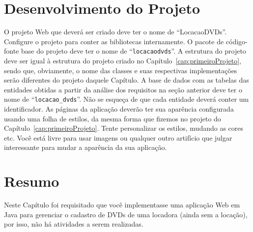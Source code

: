 \section{Desenvolvimento do Projeto}

O projeto Web que deverá ser criado deve ter o nome de ``LocacaoDVDs''. Configure o projeto para conter as bibliotecas internamente. O pacote de código-fonte base do projeto deve ter o nome de ``\texttt{locacaodvds}''. A estrutura do projeto deve ser igual à estrutura do projeto criado no Capítulo~\ref{cap:primeiroProjeto}, sendo que, obviamente, o nome das classes e suas respectivas implementações serão diferentes do projeto daquele Capítulo. A base de dados com as tabelas das entidades obtidas a partir da análise dos requisitos na seção anterior deve ter o nome de ``\texttt{locacao\_dvds}''. Não se esqueça de que cada entidade deverá conter um identificador. As páginas da aplicação deverão ter sua aparência configurada usando uma folha de estilos, da mesma forma que fizemos no projeto do Capítulo~\ref{cap:primeiroProjeto}. Tente personalizar os estilos, mudando as cores etc. Você está livre para usar imagens ou qualquer outro artifício que julgar interessante para mudar a aparência da sua aplicação.


\section{Resumo}

Neste Capítulo foi requisitado que você implementasse uma aplicação Web em Java para gerenciar o cadastro de DVDs de uma locadora (ainda sem a locação), por isso, não há atividades a serem realizadas.
